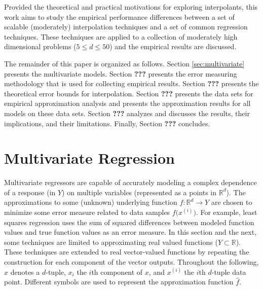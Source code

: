 \documentclass[smallextended]{svjour3}       %
\begin{document}
Provided the theoretical and practical motivations for exploring interpolants, this work aims to study the empirical performance differences between a set of scalable (moderately) interpolation techniques and a set of common regression techniques. These techniques are applied to a collection of moderately high dimensional problems ($5 \le d \le 50$) and the empirical results are discussed.

The remainder of this paper is organized as follows. Section \ref{sec:multivariate} presents the multivariate models. Section \textbf{???} presents the error measuring methodology that is used for collecting empirical results. Section \textbf{???} presents the theoretical error bounds for interpolation. Section \textbf{???} presents the data sets for empirical approximation analysis and presents the approximation results for all models on these data sets. Section \textbf{???} analyzes and discusses the results, their implications, and their limitations. Finally, Section \textbf{???} concludes.



\section{Multivariate Regression}
Multivariate regressors are capable of accurately modeling a complex dependence of a response (in $Y$) on multiple variables (represented as a points in $\mathbb{R}^{d}$). The approximations to some (unknown) underlying function $f: \mathbb{R}^d \rightarrow Y$ are chosen to minimize some error measure related to data samples $f\bigl(x^{(i)}\bigr)$. For example, least squares regression uses the sum of squared differences between modeled function values and true function values as an error measure. In this section and the next, some techniques are limited to approximating real valued functions ($Y \subset \mathbb{R}$). These techniques are extended to real vector-valued functions by repeating the construction for each component of the vector outputs. Throughout the following, $x$ denotes a $d$-tuple, $x_i$ the $i$th component of $x$, and $x^{(i)}$ the $i$th $d$-tuple data point. Different symbols are used to represent the approximation function $\hat f$.
\end{document}
